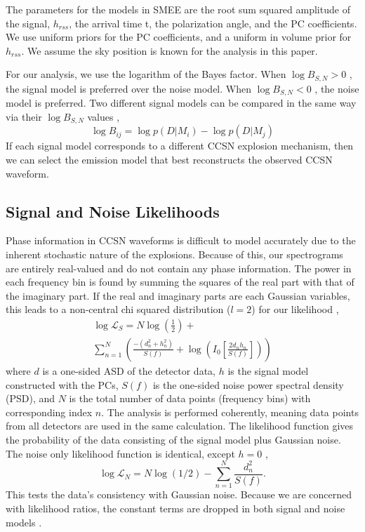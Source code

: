 \documentclass[letterpaper, aps, prd, twocolumn, superscriptaddress, showpacs, nofootinbib]{revtex4}
\begin{document}
The parameters for the models in SMEE are the root sum squared amplitude of the signal, $h_{rss}$, the arrival time t, the polarization angle, and the PC coefficients. We use uniform priors for the PC coefficients, and a uniform in volume prior for $h_{rss}$. We assume the sky position is known for the analysis in this paper. %

For our analysis, we use the logarithm of the Bayes factor. When $\log B_{S,N} > 0$ , the signal model is preferred over the noise model. When $\log B_{S,N} < 0$ , the noise model is preferred. Two different signal models can be compared in the same way via their $\log B_{S,N}$ values \cite{veitch:15},
\begin{equation}
\log B_{ij} = \log p(D|M_{i}) - \log p(D|M_{j})
\end{equation}
If each signal model corresponds to a different CCSN explosion mechanism, then we can select the emission model that best reconstructs the observed CCSN waveform.

\subsection{Signal and Noise Likelihoods}

Phase information in CCSN waveforms is difficult to model accurately due to the inherent stochastic nature of the explosions. Because of this, our spectrograms are entirely real-valued and do not contain any phase information. The power in each frequency bin is found by summing the squares of the real part with that of the imaginary part. If the real and imaginary parts are each Gaussian variables, this leads to a non-central chi squared distribution ($l = 2$) for our likelihood \cite{logue:12},
\begin{multline}
\log \mathcal{L}_{S} = N\log\left(\frac{1}{2}\right) + \\ \sum_{n=1}^{N} \left( \frac{-(d_{n}^{2} + h_{n}^{2})}{S(f)} +  \log\left(I_0\left[\frac{2 d_{n} h_{n}}{S(f)}\right]\right) \right)
\end{multline}
where $d$ is a one-sided ASD of the detector data, $h$ is the signal model constructed with the PCs, $S(f)$ is the one-sided noise power spectral density (PSD), and $N$ is the total number of data points (frequency bins) with corresponding index $n$. The analysis is performed coherently, meaning data points from all detectors are used in the same calculation. The likelihood function gives the probability of the data consisting of the signal model plus Gaussian noise. The noise only likelihood function is identical, except $h = 0$ \cite{logue:12},
\begin{equation}
\log \mathcal{L}_{N} = N\log(1/2) - \sum_{n=1}^{N} \frac{d_{n}^{2}}{S(f)} .
\end{equation}
This tests the data's consistency with Gaussian noise. Because we are concerned with likelihood ratios, the constant terms are dropped in both signal and noise models \cite{logue:12, powell:16b}.
\end{document}
